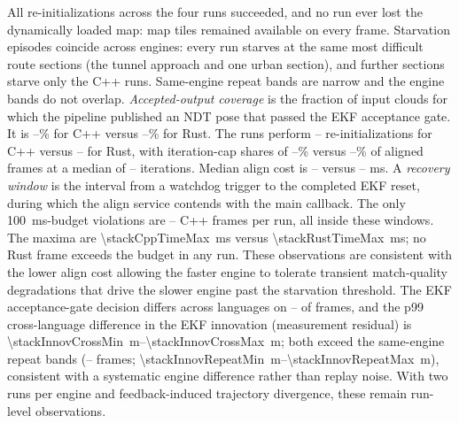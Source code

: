 All \stackReinitTotal{} re-initializations across the four runs succeeded, and no run ever
lost the dynamically loaded map: map tiles remained available on every frame. Starvation
episodes coincide across engines: every run starves at the same \stackSharedEpisodes{}
most difficult route sections (the tunnel approach and one urban section), and
\stackCppOnlyEpisodes{} further sections starve only the C++ runs. Same-engine repeat
bands are narrow and the engine bands do not overlap. \emph{Accepted-output coverage} is
the fraction of input clouds for which the pipeline published an NDT pose that passed the
EKF acceptance gate. It is
\stackCppSurvMin--\stackCppSurvMax\% for C++ versus \stackRustSurvMin--\stackRustSurvMax\%
for Rust. The runs perform \stackCppReinitMin--\stackCppReinitMax{} re-initializations for
C++ versus \stackRustReinitMin--\stackRustReinitMax{} for Rust, with iteration-cap
shares of \stackCppCapMin--\stackCppCapMax\% versus \stackRustCapMin--\stackRustCapMax\%
of aligned frames at a median of \stackIterMedMin--\stackIterMedMax{} iterations. Median
align cost is \stackCppExeMedMin--\stackCppExeMedMax{} versus
\stackRustExeMedMin--\stackRustExeMedMax{} \si{ms}. A \emph{recovery window} is the
interval from a watchdog trigger to the completed EKF reset, during which the align service
contends with the main callback. The only \SI{100}{ms}-budget
violations are \stackCppOverMin--\stackCppOverMax{} C++ frames per run, all inside these
windows. The maxima are
\SI{\stackCppTimeMax}{ms} versus \SI{\stackRustTimeMax}{ms}; no Rust frame exceeds the
budget in any run. These observations are consistent with the lower align cost allowing
the faster engine to tolerate transient match-quality degradations that drive the slower
engine past the starvation threshold. The EKF acceptance-gate decision differs across
languages on \stackQCrossMin--\stackQCrossMax{} of \stackInputFrames{} frames, and the p99
cross-language difference in the EKF innovation (measurement residual) is
\SI{\stackInnovCrossMin}{m}--\SI{\stackInnovCrossMax}{m}; both exceed the same-engine
repeat bands (\stackQRepeatMin--\stackQRepeatMax{} frames;
\SI{\stackInnovRepeatMin}{m}--\SI{\stackInnovRepeatMax}{m}), consistent with a systematic
engine difference rather than replay noise. With two runs per engine and
feedback-induced trajectory divergence, these remain run-level observations.

